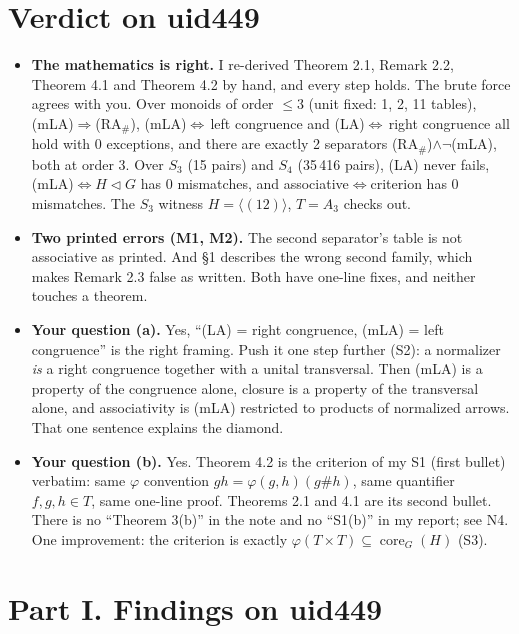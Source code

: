 \documentclass[11pt]{article}
\newcommand{\core}{\operatorname{core}}
\begin{document}
\section*{Verdict on uid449}
\begin{itemize}[leftmargin=*]
\item \textbf{The mathematics is right.} I re-derived Theorem 2.1, Remark 2.2, Theorem 4.1 and
  Theorem 4.2 by hand, and every step holds. The brute force agrees with you. Over monoids of order
  ${\le}3$ (unit fixed: 1, 2, 11 tables), (mLA)$\Rightarrow$(RA$_\#$), (mLA)$\Leftrightarrow$\,left
  congruence and (LA)$\Leftrightarrow$\,right congruence all hold with 0 exceptions, and there are exactly 2
  separators (RA$_\#$)$\wedge\neg$(mLA), both at order 3. Over $S_3$ (15 pairs) and $S_4$ (35\,416 pairs),
  (LA) never fails, (mLA)$\Leftrightarrow H\lhd G$ has 0 mismatches, and associative$\Leftrightarrow$criterion
  has 0 mismatches. The $S_3$ witness $H=\langle(12)\rangle$, $T=A_3$ checks out.
\item \textbf{Two printed errors (M1, M2).} The second separator's table is not associative as
  printed. And \S1 describes the wrong second family, which makes Remark 2.3 false as written.
  Both have one-line fixes, and neither touches a theorem.
\item \textbf{Your question (a).} Yes, ``(LA) = right congruence, (mLA) = left congruence'' is the right
  framing. Push it one step further (S2): a normalizer \emph{is} a right congruence together with a
  unital transversal. Then (mLA) is a property of the congruence alone, closure is a property of the
  transversal alone, and associativity is (mLA) restricted to products of normalized arrows. That one
  sentence explains the diamond.
\item \textbf{Your question (b).} Yes. Theorem 4.2 is the criterion of my S1 (first bullet) verbatim:
  same $\varphi$ convention $gh=\varphi(g,h)(g\#h)$, same quantifier $f,g,h\in T$, same one-line proof.
  Theorems 2.1 and 4.1 are its second bullet. There is no ``Theorem 3(b)'' in the note and no ``S1(b)'' in
  my report; see N4. One improvement: the criterion is exactly $\varphi(T\times T)\subseteq\core_G(H)$ (S3).
\end{itemize}

\section*{Part I. Findings on uid449}
\end{document}
